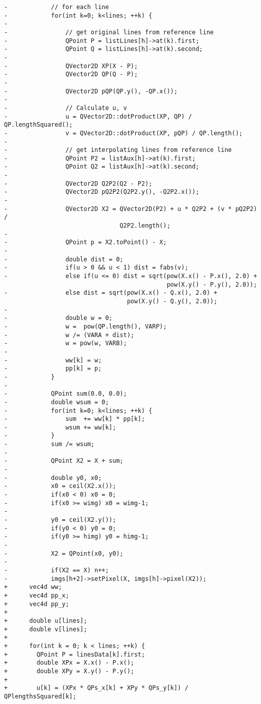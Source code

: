 \documentclass[12pt]{article}
\begin{document}
\begin{lstlisting}[caption={Precalculation and SIMD code diff}]
-            // for each line
-            for(int k=0; k<lines; ++k) {
-                
-                // get original lines from reference line
-                QPoint P = listLines[h]->at(k).first;
-                QPoint Q = listLines[h]->at(k).second;
-                
-                QVector2D XP(X - P);
-                QVector2D QP(Q - P);
-                
-                QVector2D pQP(QP.y(), -QP.x());
-                
-                // Calculate u, v
-                u = QVector2D::dotProduct(XP, QP) /  QP.lengthSquared();
-                v = QVector2D::dotProduct(XP, pQP) / QP.length();
-
-                // get interpolating lines from reference line
-                QPoint P2 = listAux[h]->at(k).first;
-                QPoint Q2 = listAux[h]->at(k).second;
-
-                QVector2D Q2P2(Q2 - P2);
-                QVector2D pQ2P2(Q2P2.y(), -Q2P2.x());
-
-                QVector2D X2 = QVector2D(P2) + u * Q2P2 + (v * pQ2P2) /
                                Q2P2.length();
-
-                QPoint p = X2.toPoint() - X;
-
-                double dist = 0;
-                if(u > 0 && u < 1) dist = fabs(v);
-                else if(u <= 0) dist = sqrt(pow(X.x() - P.x(), 2.0) + 
                                             pow(X.y() - P.y(), 2.0));
-                else dist = sqrt(pow(X.x() - Q.x(), 2.0) +
                                  pow(X.y() - Q.y(), 2.0));
-
-                double w = 0;
-                w =  pow(QP.length(), VARP);
-                w /= (VARA + dist);
-                w = pow(w, VARB);
-
-                ww[k] = w;
-                pp[k] = p;
-            }
-
-            QPoint sum(0.0, 0.0);
-            double wsum = 0;
-            for(int k=0; k<lines; ++k) {
-                sum  += ww[k] * pp[k];
-                wsum += ww[k];
-            }
-            sum /= wsum;
-
-            QPoint X2 = X + sum;
-
-            double y0, x0;
-            x0 = ceil(X2.x());
-            if(x0 < 0) x0 = 0;
-            if(x0 >= wimg) x0 = wimg-1;
-
-            y0 = ceil(X2.y());
-            if(y0 < 0) y0 = 0;
-            if(y0 >= himg) y0 = himg-1;
-
-            X2 = QPoint(x0, y0);
-
-            if(X2 == X) n++;
-            imgs[h+2]->setPixel(X, imgs[h]->pixel(X2));
+      vec4d ww;
+      vec4d pp_x;
+      vec4d pp_y;
+      
+      double u[lines];
+      double v[lines];
+
+      for(int k = 0; k < lines; ++k) {
+        QPoint P = linesData[k].first;
+        double XPx = X.x() - P.x();
+        double XPy = X.y() - P.y();
+
+        u[k] = (XPx * QPs_x[k] + XPy * QPs_y[k]) / QPlengthsSquared[k];

\end{lstlisting}
\end{document}
